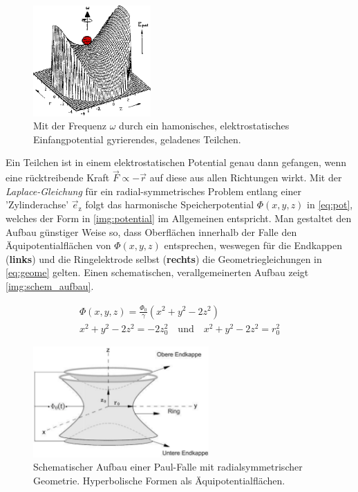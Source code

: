 \documentclass[numbers=noenddot,a4paper,notitlepage,twoside,BCOR15mm]{scrartcl}
\newcommand{\ix}[1]{_\text{#1}}
\newcommand{\tilt}[1]{\textit{#1}}
\newcommand{\fett}[1]{\textbf{#1}}
\begin{document}
				\begin{figure}
					\centering
					\vspace{-0.5cm}
					\includegraphics[width=0.4\textwidth]{paulpotential.png}
					\caption{Mit der Frequenz $\omega$ durch ein hamonisches, elektrostatisches Einfangpotential gyrierendes, geladenes Teilchen. \cite{UMainzReflektron}}\label{img:potential}
				\end{figure}

			Ein Teilchen ist in einem elektrostatischen Potential genau dann gefangen, wenn eine rücktreibende Kraft $\vec{F}\propto-\vec{r}$ auf diese aus allen Richtungen wirkt. Mit der \tilt{Laplace-Gleichung} für ein radial-symmetrisches Problem entlang einer 'Zylinderachse' $\vec{e}\ix{z}$ folgt das harmonische Speicherpotential $\Phi(x,y,z)$ in \autoref{eq:pot}, welches der Form in \autoref{img:potential} im Allgemeinen entspricht. Man gestaltet den Aufbau günstiger Weise so, dass Oberflächen innerhalb der Falle den Äquipotentialflächen von $\Phi(x,y,z)$ entsprechen, weswegen für die Endkappen (\fett{links}) und die Ringelektrode selbst (\fett{rechts}) die Geometriegleichungen in \autoref{eq:geome} gelten. Einen schematischen, verallgemeinerten Aufbau zeigt \autoref{img:schem_aufbau}.

				\begin{align}
					\Phi(x,y,z)=\frac{\Phi\ix{0}}{\gamma}(x^2+y^2-2z^2) \label{eq:pot} \\
					x^2+y^2-2z^2=-2z\ix{0}^2 \quad\text{und}\quad x^2+y^2-2z^2=r\ix{0}^2 \label{eq:geome}
				\end{align}

				\begin{figure}[t]
					\centering
					\includegraphics[width=0.6\textwidth]{paul_schema.png}
					\caption{Schematischer Aufbau einer Paul-Falle mit radialsymmetrischer Geometrie. Hyperbolische Formen als Äquipotentialflächen. \cite{EMAUGreifswaldPaul}}\label{img:schem_aufbau}
				\end{figure}
\end{document}
